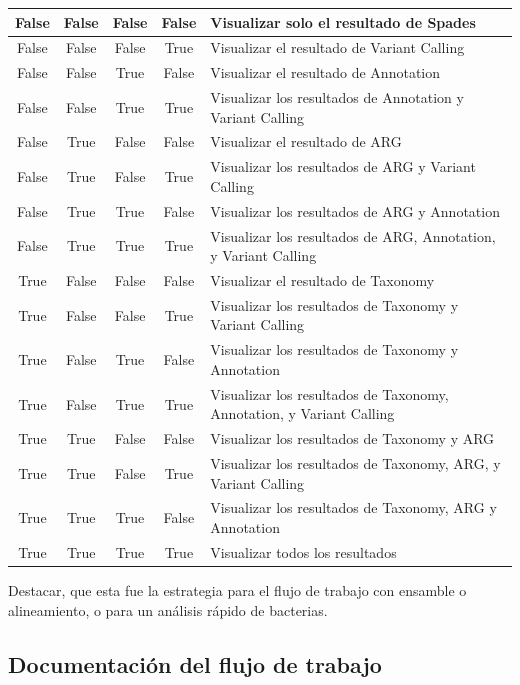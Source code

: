 \documentclass[12pt]{article}
\begin{document}
\begin{longtable}{|c|c|c|c|p{6cm}|}
    False & False & False & False & Visualizar solo el resultado de Spades \\
    \hline
    False & False & False & True & Visualizar el resultado de Variant Calling \\
    \hline
    False & False & True & False & Visualizar el resultado de Annotation \\
    \hline
    False & False & True & True & Visualizar los resultados de Annotation y Variant Calling \\
    \hline
    False & True & False & False & Visualizar el resultado de ARG \\
    \hline
    False & True & False & True & Visualizar los resultados de ARG y Variant Calling \\
    \hline
    False & True & True & False & Visualizar los resultados de ARG y Annotation \\
    \hline
    False & True & True & True & Visualizar los resultados de ARG, Annotation, y Variant Calling \\
    \hline
    True & False & False & False & Visualizar el resultado de Taxonomy \\
    \hline
    True & False & False & True & Visualizar los resultados de Taxonomy y Variant Calling \\
    \hline
    True & False & True & False & Visualizar los resultados de Taxonomy y Annotation \\
    \hline
    True & False & True & True & Visualizar los resultados de Taxonomy, Annotation, y Variant Calling \\
    \hline
    True & True & False & False & Visualizar los resultados de Taxonomy y ARG \\
    \hline
    True & True & False & True & Visualizar los resultados de Taxonomy, ARG, y Variant Calling \\
    \hline
    True & True & True & False & Visualizar los resultados de Taxonomy, ARG y Annotation \\
    \hline
    True & True & True & True & Visualizar todos los resultados \\
    \hline
\end{longtable}

Destacar, que esta fue la estrategia para el flujo de 
trabajo con ensamble o alineamiento, o para un análisis 
rápido de bacterias.

\subsection{Documentación del flujo de trabajo}
\end{document}
